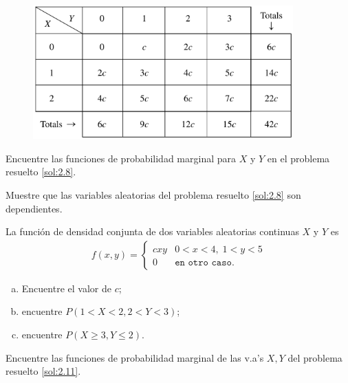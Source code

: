  \begin{figure}[h]
 \centering
 \includegraphics[width=10cm,keepaspectratio=true]{./pe/tab0206.png}
 \label{tab:2.6}
\end{figure}



 \begin{ejemplo}
  \label{sol:2.9}
  Encuentre las funciones de probabilidad marginal para $X$ y $Y$ en el problema resuelto \ref{sol:2.8}.
 \end{ejemplo}



 \begin{ejemplo}
  \label{sol:2.10}
  Muestre que las variables aleatorias del problema resuelto \ref{sol:2.8} son dependientes.
 \end{ejemplo}



 \begin{ejemplo}
  \label{sol:2.11}
  La función de densidad conjunta de dos variables aleatorias continuas $X$ y $Y$ es
  \begin{align}
   f(x,y)=
   \begin{cases}
    cxy & 0<x<4, \; 1<y<5\\
    0 & \texttt{en otro caso}.
   \end{cases}
  \end{align}

 \end{ejemplo}
\begin{enumerate}[(a)]
 \item Encuentre el valor de $c$;
 \item encuentre $P(1<X<2,2<Y<3)$;
 \item encuentre $P(X\geq 3, Y\leq 2)$.
\end{enumerate}



 \begin{ejemplo}
  \label{sol:2.12}
  Encuentre las funciones de probabilidad marginal de las v.a's $X,Y$ del problema resuelto \ref{sol:2.11}.
 \end{ejemplo}



